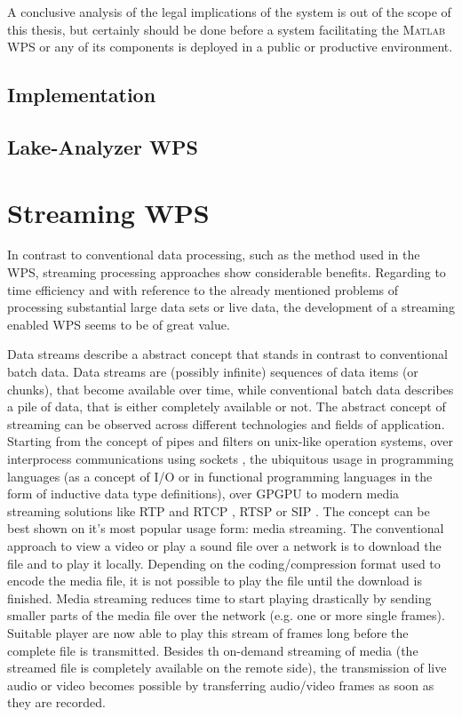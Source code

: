 		A conclusive analysis of the legal implications of the system is out of the scope of this thesis, but certainly should be done before a system facilitating the \textsc{Matlab} WPS or any of its components is deployed in a public or productive environment.
	\section{Implementation}

	\section{Lake-Analyzer WPS}
\chapter{Streaming WPS}
	In contrast to conventional data processing, such as the method used in the \ac{WPS}, streaming processing approaches show considerable benefits. Regarding to time efficiency and with reference to the already mentioned problems of processing substantial large data sets or live data, the development of a streaming enabled \ac{WPS} seems to be of great value.

	Data streams describe a abstract concept that stands in contrast to conventional batch data. Data streams are (possibly infinite) sequences of data items (or chunks), that become available over time, while conventional batch data describes a pile of data, that is either completely available or not. The abstract concept of streaming can be observed across different technologies and fields of application. Starting from the concept of pipes and filters on unix-like operation systems, over interprocess communications using sockets \citep[either local or over a network,][]{buschmann1996pattern}, the ubiquitous usage in programming languages (as a concept of I/O or in functional programming languages in the form of inductive data type definitions), over \ac{GPGPU} to modern media streaming solutions like RTP and RTCP \citep{ietf:rfc3550}, RTSP \citep{ietf:rfc2326} or SIP \citep{ietf:rfc3261}.
	The concept can be best shown on it's most popular usage form: media streaming. The conventional approach to view a video or play a sound file over a network is to download the file and to play it locally. Depending on the coding/compression format used to encode the media file, it is not possible to play the file until the download is finished. Media streaming reduces time to start playing drastically by sending smaller parts of the media file over the network (e.g. one or more single frames). Suitable player are now able to play this stream of frames long before the complete file is transmitted. Besides th on-demand streaming of media (the streamed file is completely available on the remote side), the transmission of live audio or video becomes possible by transferring audio/video frames as soon as they are recorded.

